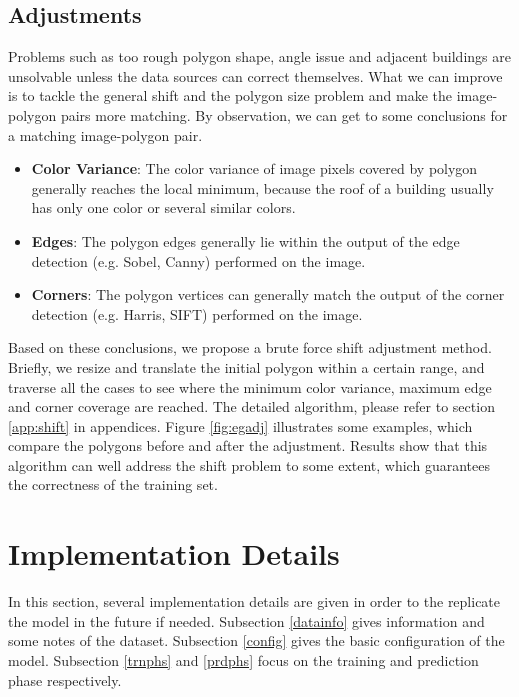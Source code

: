 \subsection{Adjustments}\label{adjust}
Problems such as too rough polygon shape, angle issue and adjacent buildings are unsolvable unless the data sources can correct themselves. What we can improve is to tackle the general shift and the polygon size problem and make the image-polygon pairs more matching. By observation, we can get to some conclusions for a matching image-polygon pair.

\begin{itemize}
	\item \textbf{Color Variance}: The color variance of image pixels covered by polygon generally reaches the local minimum, because the roof of a building usually has only one color or several similar colors.
	\item \textbf{Edges}: The polygon edges generally lie within the output of the edge detection (e.g. Sobel, Canny) performed on the image.
	\item \textbf{Corners}: The polygon vertices can generally match the output of the corner detection (e.g. Harris, SIFT) performed on the image.
\end{itemize}

Based on these conclusions, we propose a brute force shift adjustment method. Briefly, we resize and translate the initial polygon within a certain range, and traverse all the cases to see where the minimum color variance, maximum edge and corner coverage are reached. The detailed algorithm, please refer to section \ref{app:shift} in appendices. Figure \ref{fig:egadj} illustrates some examples, which compare the polygons before and after the adjustment. Results show that this algorithm can well address the shift problem to some extent, which guarantees the correctness of the training set.

\section{Implementation Details}\label{impdet}

In this section, several implementation details are given in order to the replicate the model in the future if needed. Subsection \ref{datainfo} gives information and some notes of the dataset. Subsection \ref{config} gives the basic configuration of the model. Subsection \ref{trnphs} and \ref{prdphs} focus on the training and prediction phase respectively.

